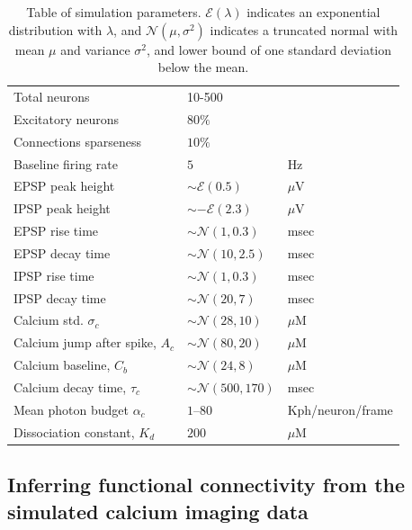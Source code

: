 \begin{table}[h!b!p!]
\caption{Table of simulation parameters. $\mathcal{E}(\lambda)$ indicates an exponential distribution with $\lambda$, and $\mathcal{N}(\mu,\sigma^2)$ indicates a truncated normal with mean $\mu$ and variance $\sigma^2$, and lower bound of one standard deviation below the mean.}\label{table:caparm}

\begin{tabular}{lll}
\hline
Total neurons & 10-500 \\
Excitatory neurons & $80\%$ \\
Connections sparseness & $10\%$ \\
Baseline firing rate & $5$  & Hz\\
\hline
EPSP peak height 	& $\sim \mathcal{E}(0.5)$ 	& $\mu$V \\
IPSP peak height 	& $\sim -\mathcal{E}(2.3)$ 	& $\mu$V \\
EPSP rise time 		& $\sim \mathcal{N}(1,0.3)$ & msec \\
EPSP decay time 	& $\sim \mathcal{N}(10,2.5)$& msec \\
IPSP rise time 		& $\sim \mathcal{N}(1,0.3)$ & msec \\
IPSP decay time 	& $\sim \mathcal{N}(20,7)$ 	& msec \\
\hline
Calcium std. $\sigma_c$ & $\sim \mathcal{N}(28,10)$ & $\mu$M \\
Calcium jump after spike, $A_c$ &  $\sim \mathcal{N}(80,20)$ & $\mu$M \\
Calcium baseline, $C_b$ & $\sim \mathcal{N}(24,8)$ & $\mu$M \\
Calcium decay time, $\tau_c$ & $\sim \mathcal{N}(500, 170)$ & msec \\
Mean photon budget $\alpha_c$ & $1$--$80$ & Kph/neuron/frame \\
Dissociation constant, $K_d$ & $200$ & $\mu$M \\
\hline
\end{tabular}
\end{table}


\subsection{Inferring functional connectivity from the simulated calcium imaging data} \label{sec:results:inference}

